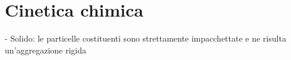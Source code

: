 \section{Cinetica chimica}
- Solido: le particelle costituenti sono strettamente impacchettate e ne risulta un'aggregazione rigida
